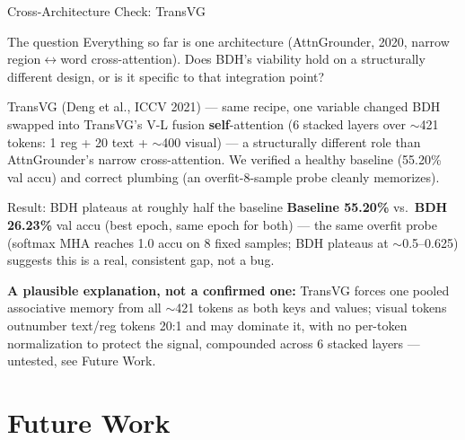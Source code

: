 \documentclass[aspectratio=169]{beamer}
\begin{document}
\begin{frame}{Cross-Architecture Check: TransVG}
  \small
  \begin{block}{The question}
    \scriptsize Everything so far is one architecture (AttnGrounder,
    2020, narrow region$\leftrightarrow$word cross-attention). Does
    BDH's viability hold on a structurally different design, or is it
    specific to that integration point?
  \end{block}
  \vspace{0.08cm}
  \begin{block}{TransVG (Deng et al., ICCV 2021) — same recipe, one variable changed}
    \scriptsize BDH swapped into TransVG's V-L fusion \textbf{self}-attention
    (6 stacked layers over $\sim$421 tokens: 1 reg + 20 text + $\sim$400
    visual) — a structurally different role than AttnGrounder's narrow
    cross-attention. We verified a healthy baseline (55.20\% val accu)
    and correct plumbing (an overfit-8-sample probe cleanly memorizes).
  \end{block}
  \vspace{0.08cm}
  \begin{alertblock}{Result: BDH plateaus at roughly half the baseline}
    \scriptsize \textbf{Baseline 55.20\%} vs.\ \textbf{BDH 26.23\%} val
    accu (best epoch, same epoch for both) — the same overfit probe
    (softmax MHA reaches 1.0 accu on 8 fixed samples; BDH plateaus at
    $\sim$0.5--0.625) suggests this is a real, consistent gap, not a
    bug.
  \end{alertblock}
  \vspace{0.05cm}
  \scriptsize\textbf{A plausible explanation, not a confirmed one:}
  TransVG forces one pooled associative memory from all $\sim$421
  tokens as both keys and values; visual tokens outnumber text/reg
  tokens 20:1 and may dominate it, with no per-token normalization to
  protect the signal, compounded across 6 stacked layers — untested,
  see Future Work.
\end{frame}

\section{Future Work}
\end{document}
